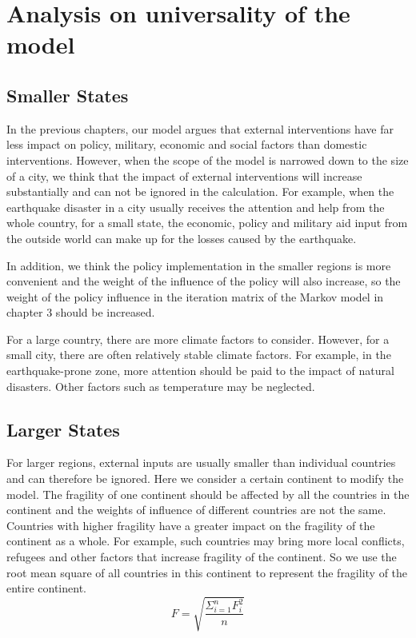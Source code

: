 \documentclass{mcmthesis}
\begin{document}
	\section{Analysis on universality of the model}
	\subsection{Smaller States}
	In the previous chapters, our model argues that external interventions have far less impact on policy, military, economic and social factors than domestic interventions. However, when the scope of the model is narrowed down to the size of a city, we think that the impact of external interventions will increase substantially and can not be ignored in the calculation. For example, when the earthquake disaster in a city usually receives the attention and help from the whole country, for a small state, the economic, policy and military aid input from the outside world can make up for the losses caused by the earthquake.
	
	In addition, we think the policy implementation in the smaller regions is more convenient and the weight of the influence of the policy will also increase, so the weight of the policy influence in the iteration matrix of the Markov model in chapter 3 should be increased.
	
	For a large country, there are more climate factors to consider. However, for a small city, there are often relatively stable climate factors. For example, in the earthquake-prone zone, more attention should be paid to the impact of natural disasters. Other factors such as temperature may be neglected.
	
	\subsection{Larger States}
	For larger regions, external inputs are usually smaller than individual countries and can therefore be ignored. Here we consider a certain continent to modify the model. The fragility of one continent should be affected by all the countries in the continent and the weights of influence of different countries are not the same. Countries with higher fragility have a greater impact on the fragility of the continent as a whole. For example, such countries may bring more local conflicts, refugees and other factors that increase fragility of the continent. So we use the root mean square of all countries in this continent to represent the fragility of the entire continent.
	$$
	F = \sqrt{\frac{\Sigma_{i=1}^n F_i^2}{n}}
	$$
	
\end{document}
